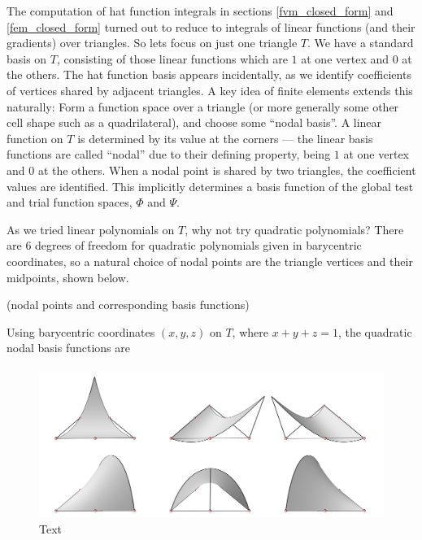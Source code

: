 The computation of hat function integrals in sections \ref{fvm_closed_form} and \ref{fem_closed_form} turned out to reduce to
integrals of linear functions (and their gradients) over triangles. So lets focus on just one triangle $T$. We have a standard basis
on $T$, consisting of those linear functions which are $1$ at one vertex and $0$ at the others. The hat function basis appears incidentally,
as we identify coefficients of vertices shared by adjacent triangles.
A key idea of finite elements extends this naturally:
Form a function space over a triangle (or more generally some other cell shape such as a quadrilateral), and choose some ``nodal basis''.
A linear function on $T$ is determined by its value at the corners --- the linear basis functions are called ``nodal'' due to their defining property,
being $1$ at one vertex and $0$ at the others. When a nodal point is shared by two triangles, the coefficient values are identified. This implicitly
determines a basis function of the global test and trial function spaces, $\Phi$ and $\Psi$.

As we tried linear polynomials on $T$, why not try quadratic polynomials? There are $6$ degrees of freedom for quadratic polynomials
given in barycentric coordinates, so a natural choice of nodal points are the triangle vertices and their midpoints, shown below.

\vskip 0.2in
(nodal points and corresponding basis functions)
\vskip 0.2in

Using barycentric coordinates $(x,y,z)$ on $T$, where $x + y + z = 1$, the quadratic nodal basis functions are
\begin{equation}\label{quadratic_nodal}
\begin{split}
\end{split}
\end{equation}


\begin{figure}[H]
    \begin{center}
        \includegraphics[width=1\linewidth]{figures/basis_functions/quadratic_basis.png}
    \end{center}
    \caption{\scriptsize
        Text
    }
    \label{quadratic_basis}
\end{figure}


